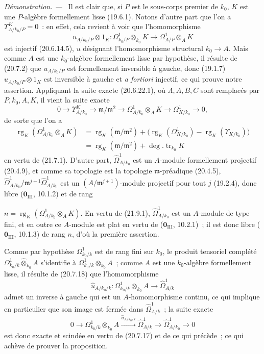 \documentclass[10pt,oneside]{book}
\newcommand{\oldpage}[2][]{%
  \setcounter{footnote}{0}%
  \marginpar{\scriptsize\textbf{#1}~|~#2}\ignorespaces}
\newenvironment{proof}{%
  \par\medskip\noindent\textit{Démonstration. ---\ }}{\par}
\begin{document}
\begin{proof}
Il est clair que, si $P$ est le sous-corps premier de $k_0$, $K$ est une
$P$-algèbre formellement lisse (19.6.1). Notons d'autre part que l'on a
$\Upsilon^K_{A/k_0/P}=0$~: en effet, cela revient à voir que l'homomorphisme
\[
  u_{A/k_0/P}\otimes1_K:
  \Omega^1_{k_0/P}\otimes_{k_0}K
  \longrightarrow \Omega^1_{A/P}\otimes_A K
\]
est injectif (20.6.14.5), $u$ désignant l'homomorphisme structural
$k_0\to A$. Mais comme $A$ est une $k_0$-algèbre formellement lisse par
hypothèse, il résulte de (20.7.2) que $u_{A/k_0/P}$ est formellement
inversible à gauche, donc (19.1.7) $u_{A/k_0/P}\otimes1_K$ est inversible à
gauche et \emph{a fortiori} injectif, ce qui prouve notre assertion.
Appliquant la suite exacte (20.6.22.1), où $\Lambda,A,B,C$ sont remplacés par
$P,k_0,A,K$, il vient la suite exacte
\[
  0\longrightarrow \Upsilon^K_{A/k_0}
  \longrightarrow \mathfrak m/\mathfrak m^2
  \longrightarrow \Omega^1_{A/k_0}\otimes_A K
  \longrightarrow \Omega^1_{K/k_0}\longrightarrow0,
\]
de sorte que l'on a
\[
\begin{split}
  \operatorname{rg}_K(\Omega^1_{A/k_0}\otimes_AK)
  &={\operatorname{rg}}_K(\mathfrak m/\mathfrak m^2)
    +\bigl(\operatorname{rg}_K(\Omega^1_{K/k_0})
    -\operatorname{rg}_K(\Upsilon_{K/k_0})\bigr)\\
  &={\operatorname{rg}}_K(\mathfrak m/\mathfrak m^2)
    +\deg.\operatorname{tr}_{k_0}K
\end{split}
\]
en vertu de (21.7.1). D'autre part, $\widehat\Omega^1_{A/k_0}$ est un
$A$-module formellement projectif (20.4.9), et comme sa topologie est la
topologie $\mathfrak m$-préadique (20.4.5),
$\widehat\Omega^1_{A/k_0}/\mathfrak m^{j+1}\widehat\Omega^1_{A/k_0}$ est un
$(A/\mathfrak m^{j+1})$-module projectif pour tout $j$ (19.2.4), donc libre
($\mathbf 0_{\mathrm{III}}$, 10.1.2) et de rang

\oldpage[0\textsubscript{IV-1}]{177}
$n=\operatorname{rg}_K(\Omega^1_{A/k_0}\otimes_AK)$. En vertu de (21.9.1),
$\widehat\Omega^1_{A/k_0}$ est un $A$-module de type fini, et en outre ce
$A$-module est plat en vertu de ($\mathbf 0_{\mathrm{III}}$, 10.2.1)~; il est
donc libre ($\mathbf 0_{\mathrm{III}}$, 10.1.3) de rang $n$, d'où la première
assertion.

Comme par hypothèse $\Omega^1_{k_0/k}$ est de rang fini sur $k_0$, le produit
tensoriel complété
$\Omega^1_{k_0/k}\widehat\otimes_{k_0}A$ s'identifie à
$\Omega^1_{k_0/k}\otimes_{k_0}A$~; comme $A$ est une $k_0$-algèbre
formellement lisse, il résulte de (20.7.18) que l'homomorphisme
\[
  \widehat u_{A/k_0/k}:
  \Omega^1_{k_0/k}\otimes_{k_0}A
  \longrightarrow\widehat\Omega^1_{A/k}
\]
admet un inverse à gauche qui est un $A$-homomorphisme continu, ce qui
implique en particulier que son image est fermée dans
$\widehat\Omega^1_{A/k}$~; la suite exacte
\[
  0\longrightarrow \Omega^1_{k_0/k}\otimes_{k_0}A
  \xrightarrow{\widehat u_{A/k_0/k}}\widehat\Omega^1_{A/k}
  \longrightarrow\widehat\Omega^1_{A/k_0}\longrightarrow0
\]
est donc exacte et scindée en vertu de (20.7.17) et de ce qui précède~; ce
qui achève de prouver la proposition.
\end{proof}
\end{document}
